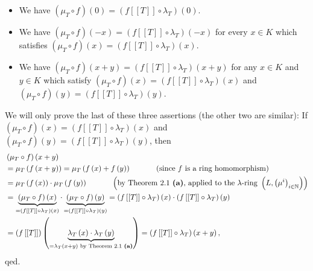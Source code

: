 \documentclass[numbers=enddot,12pt,final,onecolumn,notitlepage]{scrartcl}%
\begin{document}
\begin{itemize}
\item We have $\left(  \mu_{T}\circ f\right)  \left(  0\right)  =\left(
f\left[  \left[  T\right]  \right]  \circ\lambda_{T}\right)  \left(  0\right)
$.

\item We have $\left(  \mu_{T}\circ f\right)  \left(  -x\right)  =\left(
f\left[  \left[  T\right]  \right]  \circ\lambda_{T}\right)  \left(
-x\right)  $ for every $x\in K$ which satisfies $\left(  \mu_{T}\circ
f\right)  \left(  x\right)  =\left(  f\left[  \left[  T\right]  \right]
\circ\lambda_{T}\right)  \left(  x\right)  $.

\item We have $\left(  \mu_{T}\circ f\right)  \left(  x+y\right)  =\left(
f\left[  \left[  T\right]  \right]  \circ\lambda_{T}\right)  \left(
x+y\right)  $ for any $x\in K$ and $y\in K$ which satisfy $\left(  \mu
_{T}\circ f\right)  \left(  x\right)  =\left(  f\left[  \left[  T\right]
\right]  \circ\lambda_{T}\right)  \left(  x\right)  $ and $\left(  \mu
_{T}\circ f\right)  \left(  y\right)  =\left(  f\left[  \left[  T\right]
\right]  \circ\lambda_{T}\right)  \left(  y\right)  $.
\end{itemize}

We will only prove the last of these three assertions (the other two are
similar): If $\left(  \mu_{T}\circ f\right)  \left(  x\right)  =\left(
f\left[  \left[  T\right]  \right]  \circ\lambda_{T}\right)  \left(  x\right)
$ and $\left(  \mu_{T}\circ f\right)  \left(  y\right)  =\left(  f\left[
\left[  T\right]  \right]  \circ\lambda_{T}\right)  \left(  y\right)  $, then%
\begin{align*}
&  \left(  \mu_{T}\circ f\right)  \left(  x+y\right) \\
&  =\mu_{T}\left(  f\left(  x+y\right)  \right)  =\mu_{T}\left(  f\left(
x\right)  +f\left(  y\right)  \right)  \ \ \ \ \ \ \ \ \ \ \left(  \text{since
}f\text{ is a ring homomorphism}\right) \\
&  =\mu_{T}\left(  f\left(  x\right)  \right)  \cdot\mu_{T}\left(  f\left(
y\right)  \right)  \ \ \ \ \ \ \ \ \ \ \left(  \text{by Theorem 2.1
\textbf{(a)}, applied to the }\lambda\text{-ring }\left(  L,\left(  \mu
^{i}\right)  _{i\in\mathbb{N}}\right)  \right) \\
&  =\underbrace{\left(  \mu_{T}\circ f\right)  \left(  x\right)  }_{=\left(
f\left[  \left[  T\right]  \right]  \circ\lambda_{T}\right)  \left(  x\right)
}\cdot\underbrace{\left(  \mu_{T}\circ f\right)  \left(  y\right)  }_{=\left(
f\left[  \left[  T\right]  \right]  \circ\lambda_{T}\right)  \left(  y\right)
}=\left(  f\left[  \left[  T\right]  \right]  \circ\lambda_{T}\right)  \left(
x\right)  \cdot\left(  f\left[  \left[  T\right]  \right]  \circ\lambda
_{T}\right)  \left(  y\right) \\
&  =\left(  f\left[  \left[  T\right]  \right]  \right)  \left(
\underbrace{\lambda_{T}\left(  x\right)  \cdot\lambda_{T}\left(  y\right)
}_{=\lambda_{T}\left(  x+y\right)  \text{ by Theorem 2.1 \textbf{(a)}}%
}\right)  =\left(  f\left[  \left[  T\right]  \right]  \circ\lambda
_{T}\right)  \left(  x+y\right)  ,
\end{align*}
qed.
\end{document}
